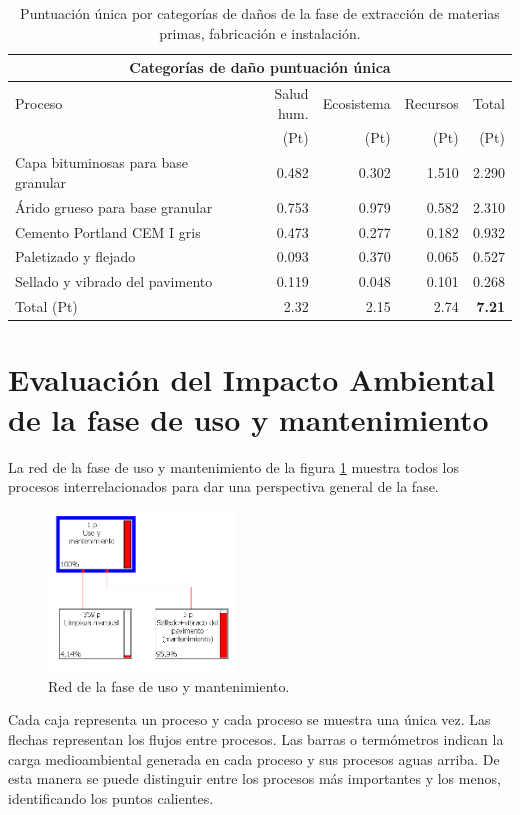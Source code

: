 \begin{table}[!htb]
\centering
\begin{tabular}{p{6cm}rrrr}
\toprule
\multicolumn{5}{c}{Categorías de daño puntuación única}\\
\midrule
Proceso & Salud hum. & Ecosistema & Recursos & Total\\
 & (Pt) & (Pt) &  (Pt) & (Pt)\\
\midrule
Capa bituminosas para base granular & 0.482 & 0.302 & 1.510 & 2.290\\
Árido grueso para base granular & 0.753 & 0.979 & 0.582 & 2.310\\
Cemento Portland CEM I gris & 0.473 & 0.277 & 0.182 & 0.932\\
Paletizado y flejado & 0.093 & 0.370 & 0.065 & 0.527\\
Sellado y vibrado del pavimento & 0.119 & 0.048 & 0.101 & 0.268\\
\midrule
Total (Pt) & 2.32 & 2.15 & 2.74 & \textbf{7.21}\\
\bottomrule
\end{tabular}
\caption{Puntuación única por categorías de daños de la fase de extracción de materias primas, fabricación e instalación.}
\label{categoriasdanosfabricacion}
\end{table}

\section{Evaluación del Impacto Ambiental de la fase de uso y mantenimiento}

La red de la fase de uso y mantenimiento de la figura \ref{fig:uso_red} muestra todos los procesos interrelacionados para dar una perspectiva general de la fase.

\begin{figure}[!htb]
\centering
\includegraphics[width=5cm]{img/uso_red.png}
\caption{Red de la fase de uso y mantenimiento.}
\label{fig:uso_red}
\end{figure}

Cada caja representa un proceso y cada proceso se muestra una única vez. Las flechas representan los flujos entre procesos. Las barras o termómetros indican la carga medioambiental generada en cada proceso y sus procesos aguas arriba. De esta manera se puede distinguir entre los procesos más importantes y los menos, identificando los puntos calientes.

